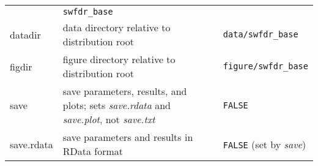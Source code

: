 \documentclass[]{article}
\begin{document}
\begin{longtable}[]{@{}lll@{}}
\begin{minipage}[t]{0.56\columnwidth}
\end{minipage} & \begin{minipage}[t]{0.18\columnwidth}\raggedright\strut
\texttt{\textquotesingle{}swfdr\_base\textquotesingle{}}\strut
\end{minipage}\tabularnewline
\begin{minipage}[t]{0.18\columnwidth}\raggedright\strut
datadir\strut
\end{minipage} & \begin{minipage}[t]{0.56\columnwidth}\raggedright\strut
data directory relative to distribution root\strut
\end{minipage} & \begin{minipage}[t]{0.18\columnwidth}\raggedright\strut
\texttt{\textquotesingle{}data/swfdr\_base\textquotesingle{}}\strut
\end{minipage}\tabularnewline
\begin{minipage}[t]{0.18\columnwidth}\raggedright\strut
figdir\strut
\end{minipage} & \begin{minipage}[t]{0.56\columnwidth}\raggedright\strut
figure directory relative to distribution root\strut
\end{minipage} & \begin{minipage}[t]{0.18\columnwidth}\raggedright\strut
\texttt{\textquotesingle{}figure/swfdr\_base\textquotesingle{}}\strut
\end{minipage}\tabularnewline
\begin{minipage}[t]{0.18\columnwidth}\raggedright\strut
save\strut
\end{minipage} & \begin{minipage}[t]{0.56\columnwidth}\raggedright\strut
save parameters, results, and plots; sets \emph{save.rdata} and
\emph{save.plot}, not \emph{save.txt}\strut
\end{minipage} & \begin{minipage}[t]{0.18\columnwidth}\raggedright\strut
\texttt{FALSE}\strut
\end{minipage}\tabularnewline
\begin{minipage}[t]{0.18\columnwidth}\raggedright\strut
save.rdata\strut
\end{minipage} & \begin{minipage}[t]{0.56\columnwidth}\raggedright\strut
save parameters and results in RData format\strut
\end{minipage} & \begin{minipage}[t]{0.18\columnwidth}\raggedright\strut
\texttt{FALSE} (set by \emph{save})\strut

\end{minipage}
\end{longtable}
\end{document}
